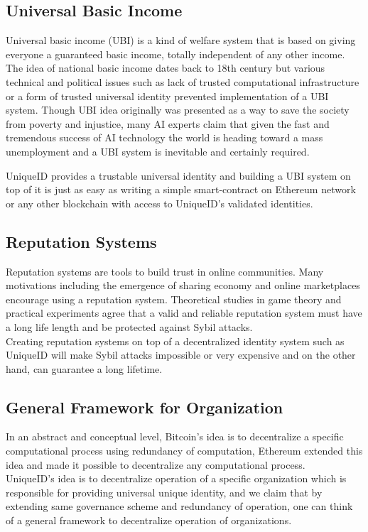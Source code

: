 \documentclass[conference]{IEEEtran}
\begin{document}
\subsection{Universal Basic Income}
Universal basic income (UBI) is a kind of welfare system that is based on giving everyone a guaranteed basic income, totally independent of any other income. The idea of national basic income dates back to 18th century but various technical and political issues such as lack of trusted computational infrastructure or a form of trusted universal identity prevented implementation of a UBI system. Though UBI idea originally was presented as a way to save the society from poverty and injustice, many AI experts claim that given the fast and tremendous success of AI technology the world is heading toward a mass unemployment and a UBI system is inevitable and certainly required.


UniqueID provides a trustable universal identity and building a UBI system on top of it is just as easy as writing a simple smart-contract on Ethereum network or any other blockchain with access to UniqueID's validated identities. 

\subsection{Reputation Systems}
Reputation systems are tools to build trust in online communities. Many motivations including the emergence of sharing economy and online marketplaces encourage using a reputation system. Theoretical studies in game theory and practical experiments agree that a valid and reliable reputation system must have a long life length and be protected against Sybil attacks. \\
Creating reputation systems on top of a decentralized identity system such as UniqueID will make Sybil attacks impossible or very expensive and on the other hand, can guarantee a long lifetime.

\subsection{General Framework for Organization}
In an abstract and conceptual level, Bitcoin's idea is to decentralize a specific computational process using redundancy of computation, Ethereum extended this idea and made it possible to decentralize any computational process.\\ UniqueID's idea is to decentralize operation of a specific organization which is responsible for providing universal unique identity, and we claim that by extending same governance scheme and redundancy of operation, one can think of a general framework to decentralize operation of organizations. 
\end{document}
